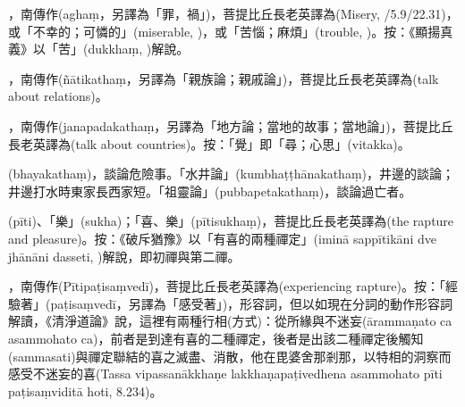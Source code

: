 \startitemgroup[noteitems]
\item{}，南傳作(aghaṃ，另譯為「罪，禍」)，菩提比丘長老英譯為(Misery, /5.9/22.31)，或「不幸的；可憐的」(miserable, )，或「苦惱；麻煩」(trouble, )。按：《顯揚真義》以「苦」(dukkhaṃ, )解說。
\stopitemgroup

\startitemgroup[noteitems]
\item{}，南傳作(ñātikathaṃ，另譯為「親族論；親戚論」)，菩提比丘長老英譯為(talk about relations)。
\item{}，南傳作(janapadakathaṃ，另譯為「地方論；當地的故事；當地論」)，菩提比丘長老英譯為(talk about countries)。按：「覺」即「尋；心思」(vitakka)。
\item{}(bhayakathaṃ)，談論危險事。「水井論」(kumbhaṭṭhānakathaṃ)，井邊的談論；井邊打水時東家長西家短。「祖靈論」(pubbapetakathaṃ)，談論過亡者。
\stopitemgroup

\startitemgroup[noteitems]
\item{}(pīti)、「樂」(sukha)；「喜、樂」(pītisukhaṃ)，菩提比丘長老英譯為(the rapture and pleasure)。按：《破斥猶豫》以「有喜的兩種禪定」(iminā sappītikāni dve jhānāni dasseti, )解說，即初禪與第二禪。
\item{}，南傳作(Pītipaṭisaṃvedī)，菩提比丘長老英譯為(experiencing rapture)。按：「經驗著」(paṭisaṃvedī，另譯為「感受著」)，形容詞，但以如現在分詞的動作形容詞解讀，《清淨道論》說，這裡有兩種行相(方式)：從所緣與不迷妄(ārammaṇato ca asammohato ca)，前者是到達有喜的二種禪定，後者是出該二種禪定後觸知(sammasati)與禪定聯結的喜之滅盡、消散，他在毘婆舍那剎那，以特相的洞察而感受不迷妄的喜(Tassa vipassanākkhaṇe lakkhaṇapaṭivedhena asammohato pīti paṭisaṃviditā hoti, 8.234)。
\stopitemgroup


